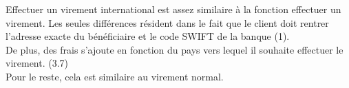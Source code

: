Effectuer un virement international est assez similaire à la fonction effectuer un virement.
Les seules différences résident dans le fait que le client doit rentrer l'adresse exacte du bénéficiaire et le code SWIFT de la banque (1).\\
De plus, des frais s'ajoute en fonction du pays vers lequel il souhaite effectuer le virement. (3.7)\\
Pour le reste, cela est similaire au virement normal.

